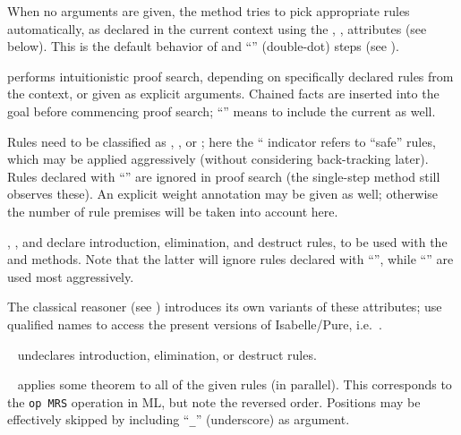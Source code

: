 \begin{isabellebody}
\begin{isamarkuptext}
\begin{descr}
  When no arguments are given, the  method tries to pick
  appropriate rules automatically, as declared in the current context
  using the , , 
  attributes (see below).  This is the default behavior of  and ``\isa{\isacommand{{\isachardot}{\isachardot}}}'' (double-dot) steps (see
  ).
  
  \item [\isa{iprover}] performs intuitionistic proof search,
  depending on specifically declared rules from the context, or given
  as explicit arguments.  Chained facts are inserted into the goal
  before commencing proof search; ``\isa{{\isacharbang}}'' 
  means to include the current  as well.
  
  Rules need to be classified as , , or ; here the ``\isa{{\isacharbang}} indicator refers
  to ``safe'' rules, which may be applied aggressively (without
  considering back-tracking later).  Rules declared with ``\isa{{\isacharquery}}'' are ignored in proof search (the single-step 
  method still observes these).  An explicit weight annotation may be
  given as well; otherwise the number of rule premises will be taken
  into account here.
  
  \item [\isa{intro}, \isa{elim}, and \isa{dest}]
  declare introduction, elimination, and destruct rules, to be used
  with the  and  methods.  Note that
  the latter will ignore rules declared with ``\isa{{\isacharquery}}'', while
  ``\isa{{\isacharbang}}''  are used most aggressively.
  
  The classical reasoner (see ) introduces its
  own variants of these attributes; use qualified names to access the
  present versions of Isabelle/Pure, i.e.\ .
  
  \item [\isa{rule}~\isa{del}] undeclares introduction,
  elimination, or destruct rules.
  
  \item [\isa{OF}~\isa{a\isactrlsub {\isadigit{1}}\ {\isasymdots}\ a\isactrlsub n}] applies some
  theorem to all of the given rules 
  (in parallel).  This corresponds to the \verb|op MRS| operation in
  ML, but note the reversed order.  Positions may be effectively
  skipped by including ``\verb|_|'' (underscore) as argument.
  

\end{descr}
\end{isamarkuptext}
\end{isabellebody}
